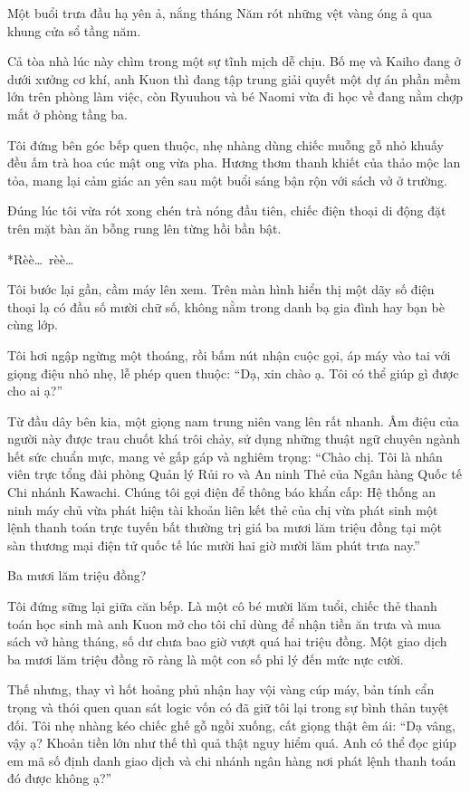 \documentclass[../main.tex]{subfiles}
\begin{document}

Một buổi trưa đầu hạ yên ả, nắng tháng Năm rót những vệt vàng óng ả qua khung cửa sổ tầng năm.

Cả tòa nhà lúc này chìm trong một sự tĩnh mịch dễ chịu. Bố mẹ và Kaiho đang ở dưới xưởng cơ khí, anh Kuon thì đang tập trung giải quyết một dự án phần mềm lớn trên phòng làm việc, còn Ryuuhou và bé Naomi vừa đi học về đang nằm chợp mắt ở phòng tầng ba.

Tôi đứng bên góc bếp quen thuộc, nhẹ nhàng dùng chiếc muỗng gỗ nhỏ khuấy đều ấm trà hoa cúc mật ong vừa pha. Hương thơm thanh khiết của thảo mộc lan tỏa, mang lại cảm giác an yên sau một buổi sáng bận rộn với sách vở ở trường.

Đúng lúc tôi vừa rót xong chén trà nóng đầu tiên, chiếc điện thoại di động đặt trên mặt bàn ăn bỗng rung lên từng hồi bần bật.

*Rèè\dots\ rèè\dots*

Tôi bước lại gần, cầm máy lên xem. Trên màn hình hiển thị một dãy số điện thoại lạ có đầu số mười chữ số, không nằm trong danh bạ gia đình hay bạn bè cùng lớp.

Tôi hơi ngập ngừng một thoáng, rồi bấm nút nhận cuộc gọi, áp máy vào tai với giọng điệu nhỏ nhẹ, lễ phép quen thuộc: ``Dạ, xin chào ạ. Tôi có thể giúp gì được cho ai ạ?''

Từ đầu dây bên kia, một giọng nam trung niên vang lên rất nhanh. Âm điệu của người này được trau chuốt khá trôi chảy, sử dụng những thuật ngữ chuyên ngành hết sức chuẩn mực, mang vẻ gấp gáp và nghiêm trọng: ``Chào chị. Tôi là nhân viên trực tổng đài phòng Quản lý Rủi ro và An ninh Thẻ của Ngân hàng Quốc tế Chi nhánh Kawachi. Chúng tôi gọi điện để thông báo khẩn cấp: Hệ thống an ninh máy chủ vừa phát hiện tài khoản liên kết thẻ của chị vừa phát sinh một lệnh thanh toán trực tuyến bất thường trị giá ba mươi lăm triệu đồng tại một sàn thương mại điện tử quốc tế lúc mười hai giờ mười lăm phút trưa nay.''

Ba mươi lăm triệu đồng?

Tôi đứng sững lại giữa căn bếp. Là một cô bé mười lăm tuổi, chiếc thẻ thanh toán học sinh mà anh Kuon mở cho tôi chỉ dùng để nhận tiền ăn trưa và mua sách vở hàng tháng, số dư chưa bao giờ vượt quá hai triệu đồng. Một giao dịch ba mươi lăm triệu đồng rõ ràng là một con số phi lý đến mức nực cười.

Thế nhưng, thay vì hốt hoảng phủ nhận hay vội vàng cúp máy, bản tính cẩn trọng và thói quen quan sát logic vốn có đã giữ tôi lại trong sự bình thản tuyệt đối. Tôi nhẹ nhàng kéo chiếc ghế gỗ ngồi xuống, cất giọng thật êm ái: ``Dạ vâng, vậy ạ? Khoản tiền lớn như thế thì quả thật nguy hiểm quá. Anh có thể đọc giúp em mã số định danh giao dịch và chi nhánh ngân hàng nơi phát lệnh thanh toán đó được không ạ?''
\end{document}
